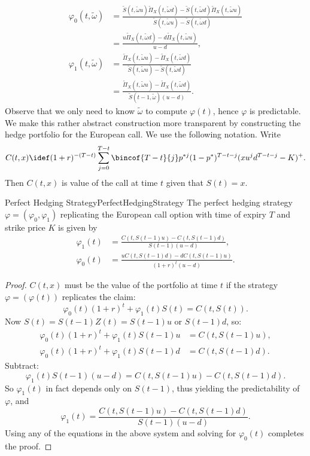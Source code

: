 \begin{align*}
	\varphi_0(t, \tilde{\omega}) & = \frac{\tilde{S}(t, \tilde{\omega}u)\tilde{\Pi}_X(t, \tilde{\omega}d) - \tilde{S}(t, \tilde{\omega}d)\tilde{\Pi}_X(t, \tilde{\omega}u)}{\tilde{S}(t, \tilde{\omega}u) - \tilde{S}(t, \tilde{\omega}d)} \\
	                             & = \frac{u\tilde{\Pi}_X(t, \tilde{\omega}d) - d\tilde{\Pi}_X(t, \tilde{\omega}u)}{u-d},                                                                                                                  \\[8pt]
	\varphi_1(t, \tilde{\omega}) & = \frac{\tilde{\Pi}_X(t, \tilde{\omega}u) - \tilde{\Pi}_X(t, \tilde{\omega}d)}{\tilde{S}(t, \tilde{\omega}u) - \tilde{S}(t, \tilde{\omega}d)}                                                           \\
	                             & = \frac{\tilde{\Pi}_X(t, \tilde{\omega}u) - \tilde{\Pi}_X(t, \tilde{\omega}d)}{\tilde{S}(t-1, \tilde{\omega})(u-d)}.
\end{align*}
Observe that we only need to know $\tilde{\omega}$ to compute $\varphi(t)$, hence $\varphi$ is predictable. We make this rather abstract construction more transparent by constructing the hedge portfolio for the European call. We use the following notation. Write
\[
	C(t, x) \idef (1+r)^{-(T-t)} \sum_{j=0}^{T-t} \bincof{T-t}{j} p^{*j} (1-p^*)^{T-t-j} (x u^j d^{T-t-j} - K)^+.
\]
Then $C(t, x)$ is value of the call at time $t$ given that $S(t) = x$.

\begin{prop}{Perfect Hedging Strategy}{PerfectHedgingStrategy}
	The perfect hedging strategy $\varphi = (\varphi_0, \varphi_1)$ replicating the European call option with time of expiry $T$ and strike price $K$ is given by
	\begin{align*}
		\varphi_1(t) & = \frac{C(t, S(t-1)u) - C(t, S(t-1)d)}{S(t-1)(u-d)},    \\
		\varphi_0(t) & = \frac{uC(t, S(t-1)d) - dC(t, S(t-1)u)}{(1+r)^t(u-d)}.
	\end{align*}
\end{prop}

\begin{proof}
	$C(t, x)$ must be the value of the portfolio at time $t$ if the strategy $\varphi = (\varphi(t))$ replicates the claim:
	\[
		\varphi_0(t)(1+r)^t + \varphi_1(t)S(t) = C(t, S(t)).
	\]
	Now $S(t) = S(t-1)Z(t) = S(t-1)u$ or $S(t-1)d$, so:
	\begin{align*}
		\varphi_0(t)(1+r)^t + \varphi_1(t)S(t-1)u & = C(t, S(t-1)u), \\
		\varphi_0(t)(1+r)^t + \varphi_1(t)S(t-1)d & = C(t, S(t-1)d).
	\end{align*}
	Subtract:
	\[
		\varphi_1(t)S(t-1)(u-d) = C(t, S(t-1)u) - C(t, S(t-1)d).
	\]
	So $\varphi_1(t)$ in fact depends only on $S(t-1)$, thus yielding the predictability of $\varphi$, and
	\[
		\varphi_1(t) = \frac{C(t, S(t-1)u) - C(t, S(t-1)d)}{S(t-1)(u-d)}.
	\]
	Using any of the equations in the above system and solving for $\varphi_0(t)$ completes the proof.
\end{proof}

